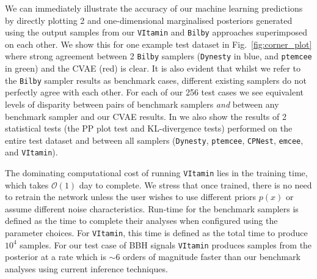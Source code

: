 \documentclass{article}
\begin{document}
%
%
We can immediately illustrate the accuracy of our machine learning predictions
by directly plotting 2 and one-dimensional marginalised posteriors generated
using the output samples from our \texttt{VItamin} and \texttt{Bilby}
approaches superimposed on each other. We show this for one example test
dataset in Fig.~\ref{fig:corner_plot} where strong agreement between 2
\texttt{Bilby} samplers (\texttt{Dynesty} in blue, and \texttt{ptemcee} in green) and the
\ac{CVAE} (red) is clear. It is also evident that whilst we refer to the
\texttt{Bilby} sampler results as benchmark cases, different existing samplers
do not perfectly agree with each other. For each of our 256 test cases we see
equivalent levels of disparity between pairs of benchmark samplers \emph{and}
between any benchmark sampler and our \ac{CVAE} results.  In \cite{1909.06296} we also 
show the results of 2 statistical tests (the \ac{PP} plot test and
\ac{KL}-divergence tests) performed on the entire test dataset and between all
samplers (\texttt{Dynesty}, \texttt{ptemcee}, \texttt{CPNest}, \texttt{emcee}, and \texttt{VItamin}).

%
%

%
%
The dominating computational cost of running \texttt{VItamin} lies in the
training time, which takes $\mathcal{O}(1)$ day to complete. We
stress that once trained, there is no need to retrain the network unless the
user wishes to use different priors $p(x)$ or assume different noise
characteristics. Run-time for the benchmark samplers is defined as the time to complete their
analyses when configured using the parameter choices. For \texttt{VItamin}, this time is defined as
the total time to produce $10^4$ samples. For our test case of \ac{BBH} signals
\texttt{VItamin} produces samples from the posterior at a rate which is $\sim
6$ orders of magnitude faster than our benchmark analyses using current
inference techniques. 
\end{document}
